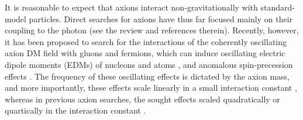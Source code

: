 It is reasonable to expect that axions interact non-gravitationally with standard-model particles.
Direct searches for axions have thus far focused mainly on their coupling to the photon (see the review \cite{Axion-Review2015} and references therein).
Recently, however, it has been proposed to search for the interactions of the coherently oscillating axion DM field with gluons and fermions, which can induce oscillating electric dipole moments (EDMs) of nucleons \cite{Graham2011} and atoms \cite{Stadnik2014A,Roberts2014A,Roberts2014B}, and anomalous spin-precession effects \cite{Flambaum2013Patras,Stadnik2014A,Graham2013}.
The frequency of these oscillating effects is dictated by the axion mass, and more importantly, these effects scale linearly in a small interaction constant \cite{Graham2011,Stadnik2014A,Roberts2014A,Roberts2014B,Flambaum2013Patras,Graham2013}, whereas in previous axion searches, the sought effects scaled quadratically or quartically in the interaction constant \cite{Axion-Review2015}.

